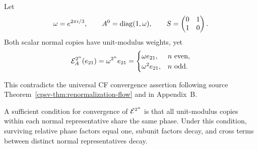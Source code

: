 \documentclass[aps,pra,reprint,nofootinbib,onecolumn]{revtex4-2}
\begin{document}
Let
\begin{align}
	\omega=e^{2\pi i/3},\qquad
	A^0=\operatorname{diag}(1,\omega),\qquad
	S=\begin{pmatrix}0&1\\1&0\end{pmatrix}.
	\label{eq:omega-A0}
\end{align}
Both scalar normal copies have unit-modulus weights, yet
\begin{align}
	\mathcal{E}_A^{2^n}(e_{21})
	=\omega^{2^n}e_{21}
	=\begin{cases}
		 \omega e_{21},  & n\text{ even}, \\
		 \omega^2e_{21}, & n\text{ odd}.
	 \end{cases}
	\label{eq:phase-cycle}
\end{align}
\begin{refutation}
	This contradicts the universal CF convergence assertion following
	source Theorem~\ref{cpsv-thm:renormalization-flow} and in Appendix~B.
\end{refutation}
A sufficient condition for convergence of $\mathcal{E}^{2^n}$ is that all
unit-modulus copies within each normal representative share the same phase.
Under this condition, surviving relative phase factors equal one, subunit
factors decay, and cross terms between distinct normal representatives decay.
\end{document}
